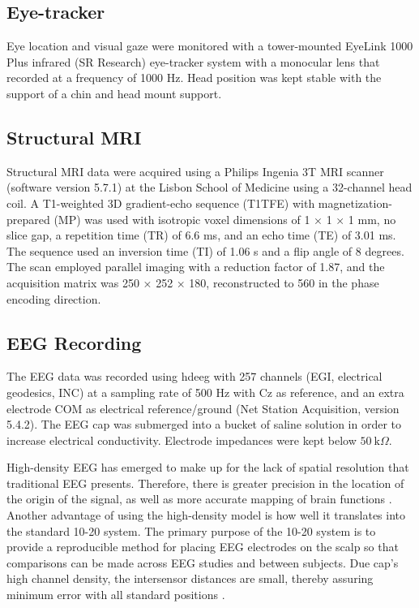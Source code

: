 \subsection{Eye-tracker}
\label{section:eye_tracking}

Eye location and visual gaze were monitored with a tower-mounted EyeLink 1000 Plus infrared (SR Research) eye-tracker system with a monocular lens that recorded at a frequency of 1000 Hz. Head position was kept stable with the support of a chin and head mount support.

\subsection{Structural MRI}
\label{section:mri}

Structural MRI data were acquired using a Philips Ingenia 3T MRI scanner (software version 5.7.1) at the Lisbon School of Medicine using a 32-channel head coil. A T1-weighted 3D gradient-echo sequence (T1TFE) with magnetization-prepared (MP) was used with isotropic voxel dimensions of 1 × 1 × 1 mm, no slice gap, a repetition time (TR) of 6.6 ms, and an echo time (TE) of 3.01 ms. The sequence used an inversion time (TI) of 1.06 s and a flip angle of 8 degrees. The scan employed parallel imaging with a reduction factor of 1.87, and the acquisition matrix was 250 × 252 × 180, reconstructed to 560 in the phase encoding direction. 

\subsection{EEG Recording}
\label{section:eeg_systems}

The EEG data was recorded using \acrfull{hdeeg} with 257 channels (EGI, electrical geodesics, INC) at a sampling rate of 500 Hz with Cz as reference, and an extra electrode COM as electrical reference/ground \cite{tuckerSpatialSamplingHead1993} (Net Station Acquisition, version 5.4.2). The EEG cap was submerged into a bucket of saline solution in order to increase electrical conductivity. Electrode impedances were kept below $50\ \text{k}\Omega$. 

High-density EEG  has emerged to make up for the lack of spatial resolution that traditional EEG presents. Therefore, there is greater precision in the location of the origin of the signal, as well as more accurate mapping of brain functions \cite{dattolaFindingsLORETAApplied2020, songEEGSourceLocalization2015}. Another advantage of using the high-density model is how well it translates into the standard 10-20 system. The primary purpose of the 10-20 system is to provide a reproducible method for placing EEG electrodes on the scalp so that comparisons can be made across EEG studies and between subjects. Due cap's high channel density, the intersensor distances are small, thereby assuring minimum error with all standard positions \cite{luuHydroCelGSN102005}.

